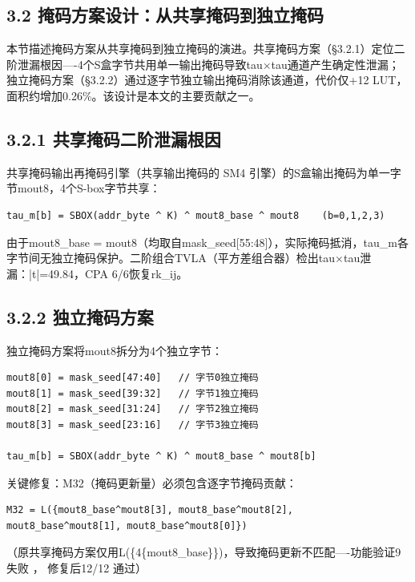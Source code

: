 \documentclass[journal]{IEEEtran}
\begin{document}
%



\subsection{3.2 掩码方案设计：从共享掩码到独立掩码}

本节描述掩码方案从共享掩码到独立掩码的演进。共享掩码方案（§3.2.1）定位二阶泄漏根因----4个S盒字节共用单一输出掩码导致tau$\times$tau通道产生确定性泄漏；独立掩码方案（§3.2.2）通过逐字节独立输出掩码消除该通道，代价仅+12 LUT，面积约增加0.26\%。该设计是本文的主要贡献之一。

\subsection{3.2.1 共享掩码二阶泄漏根因}

共享掩码输出再掩码引擎（共享输出掩码的 SM4 引擎）的S盒输出掩码为单一字节mout8，4个S-box字节共享：

\begin{lstlisting}[breaklines=true]
tau_m[b] = SBOX(addr_byte ^ K) ^ mout8_base ^ mout8    (b=0,1,2,3)
\end{lstlisting}

由于mout8\_base = mout8（均取自mask\_seed[55:48]），实际掩码抵消，tau\_m各字节间无独立掩码保护。二阶组合TVLA（平方差组合器）检出tau$\times$tau泄漏：|t|=49.84，CPA 6/6恢复rk\_ij。

\subsection{3.2.2 独立掩码方案}

独立掩码方案将mout8拆分为4个独立字节：

\begin{lstlisting}[breaklines=true]
mout8[0] = mask_seed[47:40]   // 字节0独立掩码
mout8[1] = mask_seed[39:32]   // 字节1独立掩码
mout8[2] = mask_seed[31:24]   // 字节2独立掩码
mout8[3] = mask_seed[23:16]   // 字节3独立掩码

tau_m[b] = SBOX(addr_byte ^ K) ^ mout8_base ^ mout8[b]
\end{lstlisting}

关键修复：M32（掩码更新量）必须包含逐字节掩码贡献：
\begin{lstlisting}[breaklines=true]
M32 = L({mout8_base^mout8[3], mout8_base^mout8[2], mout8_base^mout8[1], mout8_base^mout8[0]})
\end{lstlisting}
（原共享掩码方案仅用L(\{4\{mout8\_base\}\})，导致掩码更新不匹配----功能验证9 失败 ， 修复后12/12 通过）
\end{document}
